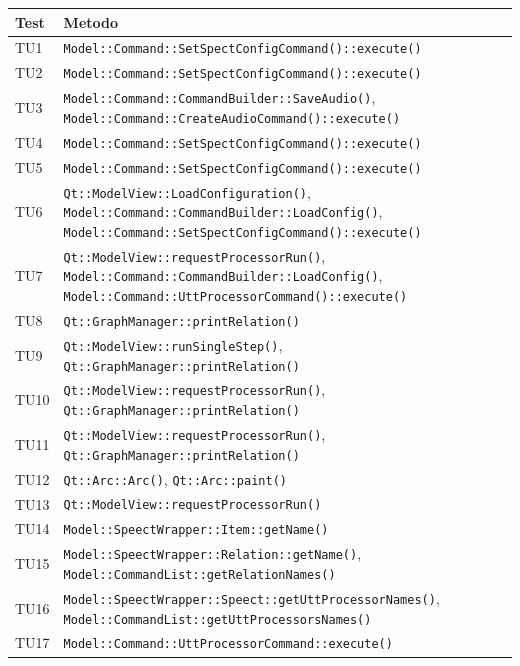 \documentclass[openany,12pt,a4paper]{report}
\begin{document}
\begin{longtable}[c]{| p{2.5cm} |p{11cm}|}
	\hline
	\textbf{Test} & \textbf{Metodo}\\
	\hline
	\endhead
	TU1&
	\verb|Model::Command::SetSpectConfigCommand()::execute()|
	\\[1em]	
	\hline
	TU2&
	\verb|Model::Command::SetSpectConfigCommand()::execute()|
	\\[1em]	
	\hline	
	TU3&
	\verb|Model::Command::CommandBuilder::SaveAudio()|, \verb|Model::Command::CreateAudioCommand()::execute()|
	\\[1em]	
	\hline	
	TU4&
	\verb|Model::Command::SetSpectConfigCommand()::execute()|
	\\[1em]	
	\hline	
	TU5&
	\verb|Model::Command::SetSpectConfigCommand()::execute()|
	\\[1em]	
	\hline	
	TU6&
	\verb|Qt::ModelView::LoadConfiguration()|, \verb|Model::Command::CommandBuilder::LoadConfig()|, \verb|Model::Command::SetSpectConfigCommand()::execute()|
	\\[1em]
	\hline	
	TU7&
	\verb|Qt::ModelView::requestProcessorRun()|,
	\verb|Model::Command::CommandBuilder::LoadConfig()|,
	\verb|Model::Command::UttProcessorCommand()::execute()|
	\\[1em]
	\hline	
	TU8&
	\verb|Qt::GraphManager::printRelation()|
	\\[1em]
	\hline	
	TU9&
	\verb|Qt::ModelView::runSingleStep()|,
	\verb|Qt::GraphManager::printRelation()|
	\\[1em]
	\hline	
	TU10&
	\verb|Qt::ModelView::requestProcessorRun()|,
	\verb|Qt::GraphManager::printRelation()|
	\\[1em]
	\hline	
	TU11&
	\verb|Qt::ModelView::requestProcessorRun()|,
	\verb|Qt::GraphManager::printRelation()|
	\\[1em]
	\hline	
	TU12&
	\verb|Qt::Arc::Arc()|,
	\verb|Qt::Arc::paint()|
	\\[1em]
	\hline
	TU13&
	\verb|Qt::ModelView::requestProcessorRun()|
	\\[1em]
	\hline
	TU14&
	\verb|Model::SpeectWrapper::Item::getName()|
	\\[1em]
	\hline	
	TU15&
	\verb|Model::SpeectWrapper::Relation::getName()|, \verb|Model::CommandList::getRelationNames()|
	\\[1em]
	\hline
	TU16&
	\verb|Model::SpeectWrapper::Speect::getUttProcessorNames()|, \verb|Model::CommandList::getUttProcessorsNames()|
	\\[1em]
	\hline
	TU17&
	\verb|Model::Command::UttProcessorCommand::execute()|
	\\[1em]

\end{longtable}
\end{document}
